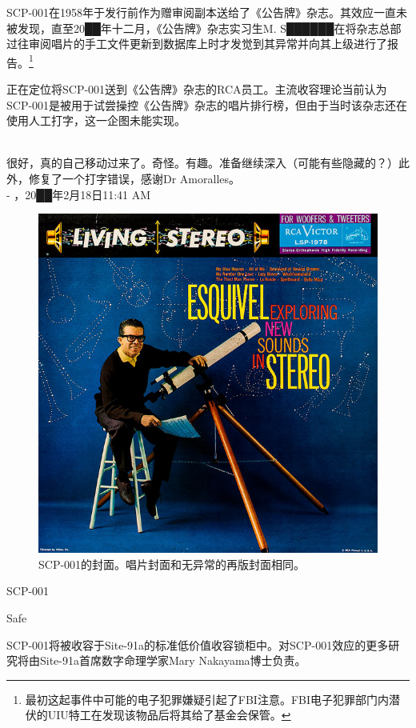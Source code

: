 SCP-001在1958年于发行前作为赠审阅副本送给了《公告牌》杂志。其效应一直未被发现，直至20██年十二月，《公告牌》杂志实习生M. S██████在将杂志总部过往审阅唱片的手工文件更新到数据库上时才发觉到其异常并向其上级进行了报告。\footnote{最初这起事件中可能的电子犯罪嫌疑引起了FBI注意。FBI电子犯罪部门内潜伏的UIU特工在发现该物品后将其给了基金会保管。\label{footnote 3}}

正在定位将SCP-001送到《公告牌》杂志的RCA员工。主流收容理论当前认为SCP-001是被用于试尝操控《公告牌》杂志的唱片排行榜，但由于当时该杂志还在使用人工打字，这一企图未能实现。


\newpage



\begin{scpbox}
 \\
很好，真的自己移动过来了。奇怪。有趣。准备继续深入（可能有些隐藏的？）此外，修复了一个打字错误，感谢Dr Amoralles。 \\
- ，20██年2月18日11:41 AM
\end{scpbox}

\begin{figure}[H]
	\centering
	\includegraphics[width=0.5\linewidth]{images/SCP-001-a-record-2.jpg}
	\caption*{SCP-001的封面。唱片封面和无异常的再版封面相同。}
\end{figure}

SCP-001

Safe

SCP-001将被收容于Site-91a的标准低价值收容锁柜中。对SCP-001效应的更多研究将由Site-91a首席数字命理学家Mary Nakayama博士负责。

